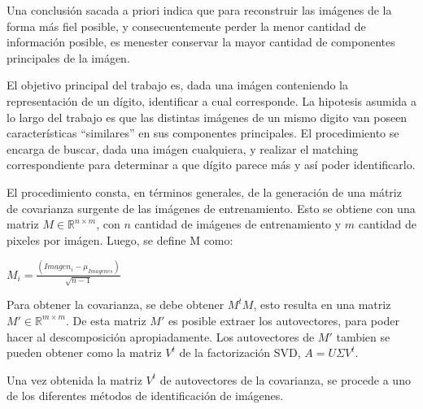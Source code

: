 Una conclusi\'on sacada a priori indica que para reconstruir las im\'agenes de la forma m\'as fiel posible,
y consecuentemente perder la menor cantidad de informaci\'on posible, es menester conservar la mayor cantidad
de componentes principales de la im\'agen.

El objetivo principal del trabajo es, dada una im\'agen conteniendo la
representaci\'on de un d\'igito,
identificar a cual corresponde. La hipotesis asumida a lo largo del trabajo es que las distintas im\'agenes
de un mismo digito van poseen caracter\'isticas ``similares'' en sus componentes principales.
El procedimiento se encarga de buscar, dada una im\'agen cualquiera, y realizar el matching correspondiente
para determinar a que d\'igito parece m\'as y as\'i poder identificarlo.

El procedimiento consta, en t\'erminos generales, de la generaci\'on de una m\'atriz de covarianza surgente
de las im\'agenes de entrenamiento. Esto se obtiene con una matriz $M \in \mathbb{R}^{n \times m}$, con $n$ cantidad
de im\'agenes de entrenamiento y $m$ cantidad de pixeles por im\'agen. Luego, se define M como:

$M_i = \frac{(Imagen_i - \mu_{Imagenes})}{\sqrt{n-1}}$

Para obtener la covarianza, se debe obtener $M^t M$, esto resulta en una matriz $M' \in \mathbb{R}^{m \times m}$.
De esta matriz $M'$ es posible extraer los autovectores, para poder hacer al descomposici\'on apropiadamente.
Los autovectores de $M'$ tambien se pueden obtener como la matriz $V^t$ de la factorizaci\'on SVD, $A=U\Sigma V^t$.

Una vez obtenida la matriz $V^t$ de autovectores de la covarianza, se procede a uno de los diferentes m\'etodos de
identificaci\'on de im\'agenes.
